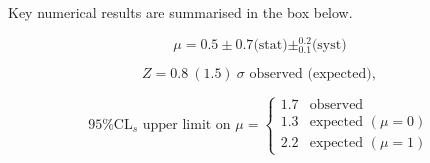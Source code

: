 Key numerical results are summarised in the box below.
\vspace{1cm}
\begin{mdframed}[backgroundcolor=aliceblue]
\vspace{3mm}
\begin{equation*}
\mu = 0.5 \pm 0.7 \text{(stat)} \pm^{0.2}_{0.1} \text{(syst)}
\end{equation*}

\begin{equation*}
Z = 0.8~(1.5)~\sigma \text{ observed (expected)},
\end{equation*}

\begin{equation*}
\text{95\% CL$_s$ upper limit on $\mu$} =
    \begin{cases}
     1.7 & \text{observed } \\
     1.3 & \text{expected } (\mu = 0) \\
     2.2 & \text{expected } (\mu = 1)
    \end{cases}
\end{equation*}
\vspace{3mm}
\end{mdframed}


